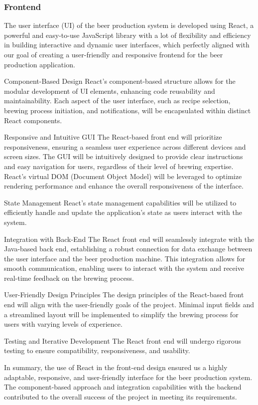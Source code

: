 \subsubsection{Frontend}
The user interface (UI) of the beer production system is developed using React, a powerful and easy-to-use JavaScript library with a lot of flexibility and efficiency in building interactive and dynamic user interfaces, which perfectly aligned with our goal of creating a user-friendly and responsive frontend for the beer production application.

Component-Based Design
React's component-based structure allows for the modular development of UI elements, enhancing code reusability and maintainability. Each aspect of the user interface, such as recipe selection, brewing process initiation, and notifications, will be encapsulated within distinct React components.

Responsive and Intuitive GUI
The React-based front end will prioritize responsiveness, ensuring a seamless user experience across different devices and screen sizes. The GUI will be intuitively designed to provide clear instructions and easy navigation for users, regardless of their level of brewing expertise. React's virtual DOM (Document Object Model) will be leveraged to optimize rendering performance and enhance the overall responsiveness of the interface.

State Management
React's state management capabilities will be utilized to efficiently handle and update the application's state as users interact with the system.

Integration with Back-End
The React front end will seamlessly integrate with the Java-based back end, establishing a robust connection for data exchange between the user interface and the beer production machine. This integration allows for smooth communication, enabling users to interact with the system and receive real-time feedback on the brewing process.

User-Friendly Design Principles
The design principles of the React-based front end will align with the user-friendly goals of the project. Minimal input fields and a streamlined layout will be implemented to simplify the brewing process for users with varying levels of experience.

Testing and Iterative Development
The React front end will undergo rigorous testing to ensure compatibility, responsiveness, and usability. 

In summary, the use of React in the front-end design ensured us a highly adaptable, responsive, and user-friendly interface for the beer production system. The component-based approach and integration capabilities with the backend contributed to the overall success of the project in meeting its requirements.

